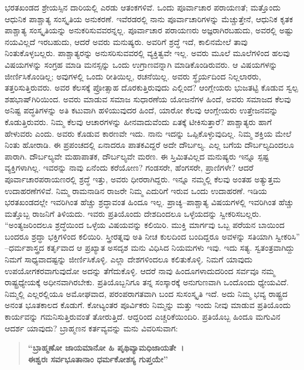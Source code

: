 ಭರತಖಂಡದ ಶ್ರೇಯಸ್ಸಿನ ದಾರಿಯಲ್ಲಿ ಎರಡು ಆತಂಕಗಳಿವೆ. ಒಂದು ಪೂರ್ವಾಚಾರ ಪರಾಯಣತೆ; ಮತ್ತೊಂದು ಆಧುನಿಕ ಪಾಶ್ಚಾತ್ಯ ಸಂಸ್ಕೃತಿಯ ಅನುಕರಣೆ. ಇವೆರಡರಲ್ಲಿ ನಾನು ಪೂರ್ವಾಚಾರಿಗಳನ್ನು ಮೆಚ್ಚುತ್ತೇನೆ, ಆಧುನಿಕ ಕೃತಕ ಪಾಶ್ಚಾತ್ಯ ಸಂಸ್ಕೃತಿಯನ್ನು ಅನುಕರಿಸುವವರನ್ನಲ್ಲ. ಪೂರ್ವಾಚಾರ ಪರಾಯಣರು ಅಜ್ಞರಾಗಿರಬಹುದು, ಅವರಲ್ಲಿ ಅಷ್ಟು ನಯವಿಲ್ಲದೆ ಇರಬಹುದು, ಆದರೆ ಅವರು ಮನುಷ್ಯರು. ಅವರಿಗೆ ಶ್ರದ್ಧೆ ಇದೆ, ಕಾಲಿನಮೇಲೆ ತಾವು ನಿಂತುಕೊಳ್ಳಬಲ್ಲರು. ಪಾಶ್ಚಾತ್ಯರನ್ನು ಅನುಸರಿಸುವವರಲ್ಲಿ ವ್ಯಕ್ತಿತ್ವವೇ ಇಲ್ಲ. ಅವರು ಮೂಲೆ ಮೂಲೆಗಳಿಂದ ಹಲವು ವಿಷಯಗಳನ್ನು ಸಂಗ್ರಹ ಮಾಡಿ ಮನಸ್ಸನ್ನು ಒಂದು ಉಗ್ರಾಣವನ್ನಾಗಿ ಮಾಡಿಕೊಂಡಿರುವರು. ಆ ವಿಷಯಗಳನ್ನು ಜೀರ್ಣಿಸಿಕೊಂಡಿಲ್ಲ; ಅವುಗಳಲ್ಲಿ ಒಂದು ರೀತಿಯಿಲ್ಲ, ರಚನೆಯಿಲ್ಲ. ಅವರು ಸ್ಥೈರ್ಯದಿಂದ ನಿಲ್ಲಲಾರರು, ತತ್ತರಿಸುತ್ತಿರುವರು. ಅವರ ಕೆಲಸಕ್ಕೆ ಪ್ರೋತ್ಸಾಹ ದೊರಕುತ್ತಿರುವುದು ಎಲ್ಲಿಂದ? ಆಂಗ್ಲೇಯರು ಭುಜತಟ್ಟಿ ಕೊಡುವ ಸ್ವಲ್ಪ ಶಹಭಾಷ್​ಗಿರಿಯಿಂದ. ಅವರು ಮಾಡುವ ಸಮಾಜ ಸುಧಾರಣೆಯ ಯೋಜನೆಗಳ ಹಿಂದೆ, ಅವರು ಸಮಾಜದ ಕೆಲವು ಅನಿಷ್ಟ ಪದ್ಧತಿಗಳನ್ನು ಅತಿ ಕಟುವಾಗಿ ಹಳಿಯುವುದರ ಹಿಂದೆ, ಯಾರೋ ಕೆಲವು ಆಂಗ್ಲೇಯರು ಉತ್ತೇಜನವನ್ನು ಕೊಡುತ್ತಿರುವರು. ನಿಮ್ಮ ಕೆಲವು ಆಚಾರಗಳನ್ನು ಹೀನವಾದುವೆಂದು ಏತಕ್ಕೆ ಟೀಕಿಸುತ್ತಾರೆ? ಪಾಶ್ಚಾತ್ಯರು ಹಾಗೆ ಹೇಳುವರು ಎಂದು. ಅವರು ಕೊಡುವ ಕಾರಣವೇ ಇದು. ನಾನು ಇದನ್ನು ಒಪ್ಪಿಕೊಳ್ಳುವುದಿಲ್ಲ. ನಿಮ್ಮ ಶಕ್ತಿಯ ಮೇಲೆ ನಿಂತು ಹೋರಾಡಿ. ಈ ಪ್ರಪಂಚದಲ್ಲಿ ಏನಾದರೂ ಪಾತಕವಿದ್ದರೆ ಅದೇ ದೌರ್ಬಲ್ಯ. ಎಲ್ಲ ಬಗೆಯ ದೌರ್ಬಲ್ಯದಿಂದಲೂ ಪಾರಾಗಿ. ದೌರ್ಬಲ್ಯವೇ ಮಹಾಪಾತಕ, ದೌರ್ಬಲ್ಯವೇ ಮರಣ. ಈ ಸ್ತಿಮಿತವಿಲ್ಲದ ಮನುಷ್ಯರು ಇನ್ನೂ ಸ್ಪಷ್ಟ ವ್ಯಕ್ತಿಗಳಾಗಿಲ್ಲ. ಇವರನ್ನು ನಾವು ಏನೆಂದು ಕರೆಯೋಣ? ಗಂಡಸರೇ, ಹೆಂಗಸರೇ, ಪ್ರಾಣಿಗಳೇ? ಆದರೆ ಪೂರ್ವಾಚಾರ\break ಪರಾಯಣರಲ್ಲಿ ಶ್ರದ್ಧೆ ಇತ್ತು, ಅವರು ಧೀರರಾಗಿದ್ದರು. ಇನ್ನೂ ನಮ್ಮಲ್ಲಿ ಕೆಲವು ಅಂತಹ ಅತ್ಯುತ್ತಮ ಉದಾಹರಣೆಗಳಿವೆ. ನಿಮ್ಮ ರಾಮನಾಡಿನ ರಾಜರೇ ನಿಮ್ಮ ಎದುರಿಗೆ ಇರುವ ಒಂದು ಉದಾಹರಣೆ. ಇಡಿಯ ಭರತಖಂಡದಲ್ಲೇ ಇವರಿಗಿಂತ ಹೆಚ್ಚು ಶ್ರದ್ಧಾವಂತ ಹಿಂದೂ ಇಲ್ಲ. ಪ್ರಾಚ್ಯ–ಪಾಶ್ಚಾತ್ಯ ವಿಷಯಗಳಲ್ಲಿ ಇವರಿಗಿಂತ ಹೆಚ್ಚು ಮತ್ತೊಬ್ಬ ರಾಜನಿಗೆ ತಿಳಿಯದು. ಇವರು ಪ್ರತಿಯೊಂದು ದೇಶದಿಂದಲೂ ಒಳ್ಳೆಯದನ್ನು ಸ್ವೀಕರಿಸಬಲ್ಲರು. “ಅಂತ್ಯಜರಿಂದಲೂ ಶ್ರದ್ಧೆಯಿಂದ ಒಳ್ಳೆಯ ವಿಷಯವನ್ನು ಕಲಿಯಿರಿ. ಮುಕ್ತಿ ಮಾರ್ಗವು ಒಬ್ಬ ಪರೆಯನ ಬಾಯಿಂದ ಬಂದರೂ ಶ್ರದ್ಧಾ ಭಕ್ತಿಗಳಿಂದ ಕಲಿಯಿರಿ. ಸ್ತ್ರೀರತ್ನವು ಅತಿ ನೀಚ ಕುಲದಿಂದ ಬಂದಿದ್ದರೂ ಅವಳನ್ನು ಸತಿಯಾಗಿ ಸ್ವೀಕರಿಸಿ” –ಧರ್ಮಶಾಸ್ತ್ರದ ಕರ್ತೃವಾದ ಆ ಪ್ರಖ್ಯಾತ ಅಸದೃಶ ಮನು ವಿಧಿಸಿದ ನಿಯಮಗಳು ಇವು. ಇದು ಸತ್ಯ. ಸ್ವತಂತ್ರವಾಗಿದ್ದು ನಿಮಗೆ ಸಾಧ್ಯವಾದಷ್ಟನ್ನು ಜೀರ್ಣಿಸಿಕೊಳ್ಳಿ. ಎಲ್ಲಾ ದೇಶಗಳಿಂದಲೂ ಕಲಿತುಕೊಳ್ಳಿ. ನಿಮಗೆ ಯಾವುದು ಉಪಯೋಗಕರವಾಗುವುದೋ ಅದನ್ನು ತೆಗೆದುಕೊಳ್ಳಿ. ಆದರೆ ನಾವು ಹಿಂದೂಗಳಾದುದರಿಂದ ಸರ್ವವೂ ನಮ್ಮ ರಾಷ್ಟ್ರಧ್ಯೇಯಕ್ಕೆ ಅಧೀನವಾಗಿರಬೇಕು. ಪ್ರತಿಯೊಬ್ಬನಿಗೂ ತನ್ನ ಸಂಸ್ಕಾರಕ್ಕೆ ಅನುಗುಣವಾಗಿ ಒಂದೊಂದು ಧ್ಯೇಯವಿದೆ. ನಿಮ್ಮಲ್ಲಿ ಎಲ್ಲರಲ್ಲಿಯೂ ಅಮೋಘವಾದ, ಪರಂಪರಾಗತವಾಗಿ ಬಂದ ಸುಸಂಸ್ಕೃತಿ ಇದೆ. ಅದು ನಿಮ್ಮ ಭವ್ಯ ರಾಷ್ಟ್ರದ ಅನಂತ ಭೂತಕಾಲದ ಕೊಡುಗೆ. ಕೋಟ್ಯಂತರ ಪೂರ್ವಿಕರು ನಿಮ್ಮನ್ನು ಮತ್ತು ಇಂದು ನೀವು ಮಾಡುವ ಪ್ರತಿಯೊಂದು ಕಾರ್ಯವನ್ನು ಗಮನಿಸುತ್ತಿರುವಂತೆ ತೋರುತ್ತಿದೆ. ಆದ್ದರಿಂದ ಎಚ್ಚರಿಕೆಯಿಂದಿರಿ. ಪ್ರತಿಯೊಬ್ಬ ಹಿಂದೂ ಮಗುವಿನ ಆದರ್ಶ ಯಾವುದು? ಬ್ರಾಹ್ಮಣನ ಕರ್ತವ್ಯವನ್ನು ಮನು ವಿವರಿಸುವಾಗ:

\begin{verse}
\textbf{“ಬ್ರಾಹ್ಮಣೋ ಜಾಯಮಾನೋ ಹಿ ಪೃಥಿವ್ಯಾಮಧಿಜಾಯತೇ~।}\\\textbf{ಈಶ್ವರಃ ಸರ್ವಭೂತಾನಾಂ ಧರ್ಮಕೋಶಸ್ಯ ಗುಪ್ತಯೇ”}
\end{verse}

